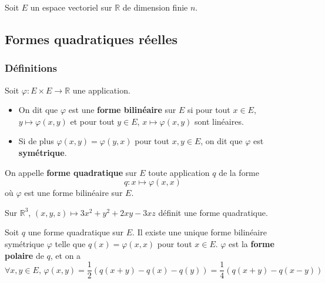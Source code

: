 




  Soit $E$ un espace vectoriel sur $\mathbb{R}$ de dimension finie $n$.

  \subsection{Formes quadratiques réelles}

  \subsubsection{Définitions}


  \begin{definition}
    Soit $\varphi : E \times E \rightarrow \mathbb{R}$ une application.
    \begin{itemize}
      \item On dit que $\varphi$ est une \textbf{forme bilinéaire} sur $E$ si pour tout $x \in E$, $y \mapsto \varphi(x, y)$ et pour tout $y \in E$, $x \mapsto \varphi(x, y)$ sont linéaires.
      \item Si de plus $\varphi(x, y) = \varphi(y, x)$ pour tout $x, y \in E$, on dit que $\varphi$ est \textbf{symétrique}.
    \end{itemize}
  \end{definition}

  \begin{definition}
    On appelle \textbf{forme quadratique} sur $E$ toute application $q$ de la forme
    \[ q : x \mapsto \varphi(x, x) \]
    où $\varphi$ est une forme bilinéaire sur $E$.
  \end{definition}

  \begin{example}
    \label{171-1}
    Sur $\mathbb{R}^3$, $(x, y, z) \mapsto 3x^2 + y^2 + 2xy - 3xz$ définit une forme quadratique.
  \end{example}

  \begin{proposition}
    Soit $q$ une forme quadratique sur $E$. Il existe une unique forme bilinéaire symétrique $\varphi$ telle que $q(x) = \varphi(x, x)$ pour tout $x \in E$. $\varphi$ est la \textbf{forme polaire} de $q$, et on a
    \[ \forall x, y \in E, \, \varphi(x, y) = \frac{1}{2} (q(x+y) - q(x) - q(y)) = \frac{1}{4} (q(x+y) - q(x-y))  \]
  \end{proposition}

